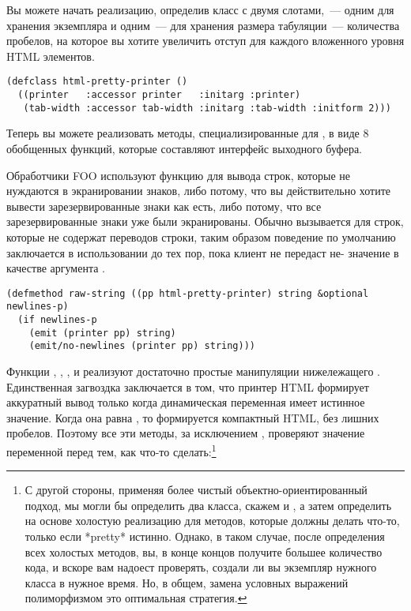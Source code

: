 Вы можете начать реализацию, определив класс с двумя слотами,~--- одним для хранения
экземпляра  и одним~--- для хранения размера табуляции~---
количества пробелов, на которое вы хотите увеличить отступ для каждого вложенного уровня
HTML элементов.

\begin{lstlisting}
(defclass html-pretty-printer ()
  ((printer   :accessor printer   :initarg :printer)
   (tab-width :accessor tab-width :initarg :tab-width :initform 2)))
\end{lstlisting}

Теперь вы можете реализовать методы, специализированные для , в
виде 8 обобщенных функций, которые составляют интерфейс выходного буфера.

Обработчики FOO используют функцию  для вывода строк, которые не
нуждаются в экранировании знаков, либо потому, что вы действительно хотите вывести
зарезервированные знаки как есть, либо потому, что все зарезервированные знаки уже были
экранированы. Обычно  вызывается для строк, которые не содержат переводов
строки, таким образом поведение по умолчанию заключается в использовании
 до тех пор, пока клиент не передаст не- значение в
качестве аргумента .

\begin{lstlisting}
(defmethod raw-string ((pp html-pretty-printer) string &optional newlines-p)
  (if newlines-p
    (emit (printer pp) string)
    (emit/no-newlines (printer pp) string)))
\end{lstlisting}

Функции , , ,  и
 реализуют достаточно простые манипуляции нижележащего
. Единственная загвоздка заключается в том, что принтер HTML
формирует аккуратный вывод только когда динамическая переменная  имеет
истинное значение. Когда она равна , то формируется компактный HTML, без лишних
пробелов. Поэтому все эти методы, за исключением , проверяют значение
переменной  перед тем, как что-то сделать:\footnote{С другой стороны,
  применяя более чистый объектно-ориентированный подход, мы могли бы определить два
  класса, скажем  и , а затем определить
  на основе  холостую реализацию для методов, которые должны делать
  что-то, только если *pretty* истинно. Однако, в таком случае, после определения всех
  холостых методов, вы, в конце концов получите большее количество кода, и вскоре вам
  надоест проверять, создали ли вы экземпляр нужного класса в нужное время. Но, в общем,
  замена условных выражений полиморфизмом это оптимальная стратегия.}

